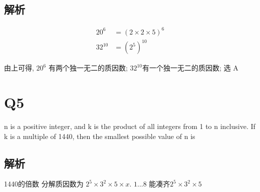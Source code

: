   \subsection{解析}

    \begin{align*}
      20^{6} &= \left( 2 \times 2 \times 5 \right)^{6} \\
      32^{10} &= \left( 2^{5} \right)^{10}
    \end{align*}

    由上可得, $ 20^{6} $ 有两个独一无二的质因数; $ 32^{10} $有一个独一无二的质因数;
    选 A

\section{Q5}

  n is a positive integer, and k is the product of all integers from 1 to n
  inclusive. If k is a multiple of 1440, then the smallest possible value of n
  is

  \subsection{解析}

    1440的倍数 分解质因数为 $ 2^{5} \times 3^{2} \times 5 \times x $. $ 1...8 $
    能凑齐$ 2^{5} \times 3^{2} \times 5 $

